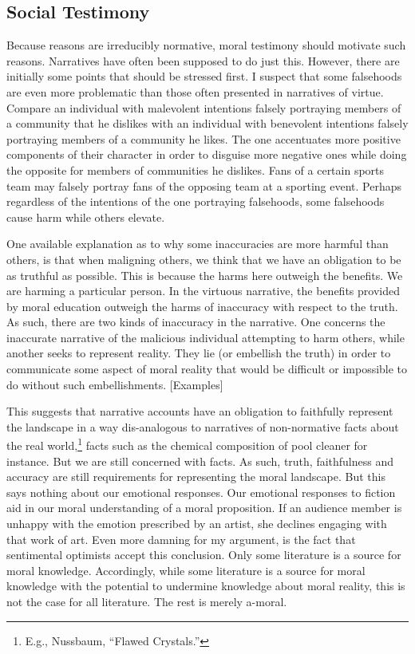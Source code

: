 \documentclass[phdthesis,12pt,final]{wuthesis}
\theoremstyle{definition}
\theoremstyle{definition}
\theoremstyle{definition}
\theoremstyle{definition}
\theoremstyle{remark}
\begin{document}
\subsection*{Social Testimony}\label{social-testimony}

Because reasons are irreducibly normative, moral testimony should motivate such reasons. Narratives have often been supposed to do just this. However, there are initially some points that should be stressed first. I suspect that some falsehoods are even more problematic than those often presented in narratives of virtue. Compare an individual with malevolent intentions falsely portraying members of a community that he dislikes with an individual with benevolent intentions falsely portraying members of a community he likes. The one accentuates more positive components of their character in order to disguise more negative ones while doing the opposite for members of communities he dislikes. Fans of a certain sports team may falsely portray fans of the opposing team at a sporting event. Perhaps regardless of the intentions of the one portraying falsehoods, some falsehoods cause harm while others elevate.

One available explanation as to why some inaccuracies are more harmful than others, is that when maligning others, we think that we have an obligation to be as truthful as possible. This is because the harms here outweigh the benefits. We are harming a particular person. In the virtuous narrative, the benefits provided by moral education outweigh the harms of inaccuracy with respect to the truth. As such, there are two kinds of inaccuracy in the narrative. One concerns the inaccurate narrative of the malicious individual attempting to harm others, while another seeks to represent reality. They lie (or embellish the truth) in order to communicate some aspect of moral reality that would be difficult or impossible to do without such embellishments. {[}Examples{]}

This suggests that narrative accounts have an obligation to faithfully represent the landscape in a way dis-analogous to narratives of non-normative facts about the real world,\footnote{E.g., Nussbaum, {``Flawed {Crystals}.''}} facts such as the chemical composition of pool cleaner for instance. But we are still concerned with facts. As such, truth, faithfulness and accuracy are still requirements for representing the moral landscape. But this says nothing about our emotional responses. Our emotional responses to fiction aid in our moral understanding of a moral proposition. If an audience member is unhappy with the emotion prescribed by an artist, she declines engaging with that work of art. Even more damning for my argument, is the fact that sentimental optimists accept this conclusion. Only some literature is a source for moral knowledge. Accordingly, while some literature is a source for moral knowledge with the potential to undermine knowledge about moral reality, this is not the case for all literature. The rest is merely a-moral.
\end{document}
